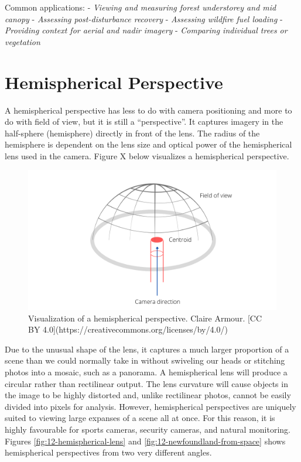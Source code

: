 \documentclass[
]{book}
\begin{document}
Common applications:
- \emph{Viewing and measuring forest understorey and mid canopy}
- \emph{Assessing post-disturbance recovery}
- \emph{Assessing wildfire fuel loading}
- \emph{Providing context for aerial and nadir imagery}
- \emph{Comparing individual trees or vegetation}

\hypertarget{hemispherical-perspective}{%
\section{Hemispherical Perspective}\label{hemispherical-perspective}}

A hemispherical perspective has less to do with camera positioning and more to do with field of view, but it is still a ``perspective''. It captures imagery in the half-sphere (hemisphere) directly in front of the lens. The radius of the hemisphere is dependent on the lens size and optical power of the hemispherical lens used in the camera. Figure X below visualizes a hemispherical perspective.

\begin{figure}
\includegraphics[width=0.9\linewidth]{images/12-hemisphere-view} \caption{Visualization of a hemispherical perspective. Claire Armour. [CC BY 4.0](https://creativecommons.org/licenses/by/4.0/)}\label{fig:12-hemisphere-view}
\end{figure}

Due to the unusual shape of the lens, it captures a much larger proportion of a scene than we could normally take in without swiveling our heads or stitching photos into a mosaic, such as a panorama. A hemispherical lens will produce a circular rather than rectilinear output. The lens curvature will cause objects in the image to be highly distorted and, unlike rectilinear photos, cannot be easily divided into pixels for analysis. However, hemispherical perspectives are uniquely suited to viewing large expanses of a scene all at once. For this reason, it is highly favourable for sports cameras, security cameras, and natural monitoring. Figures \ref{fig:12-hemispherical-lens} and \ref{fig:12-newfoundland-from-space} shows hemispherical perspectives from two very different angles.
\end{document}
